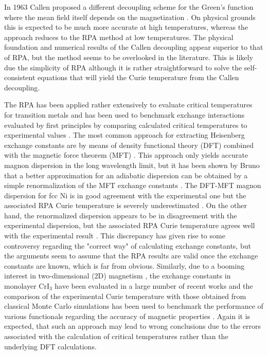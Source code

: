\documentclass[aps,prb,reprint,floatfix,superscriptaddress]{revtex4-2}
\begin{document}
In 1963 Callen proposed a different decoupling scheme for the Green's function where the mean field itself depends on the magnetization \cite{callen1963}. On physical grounds this is expected to be much more accurate at high temperatures, whereas the approach reduces to the RPA method at low temperatures. The physical foundation and numerical results of the Callen decoupling appear superior to that of RPA, but the method seems to be overlooked in the literature. This is likely due the simplicity of RPA although it is rather straightforward to solve the self-consistent equations that will yield the Curie temperature from the Callen decoupling.

The RPA has been applied rather extensively to evaluate critical temperatures for transition metals \cite{Kudrnovsky2001} and has been used to benchmark exchange interactions evaluated by first principles by comparing calculated critical temperatures to experimental values \cite{Bruno2003, Katsnelson2004}. The most common approach for extracting Heisenberg exchange constants are by means of density functional theory (DFT) combined with the magnetic force theorem (MFT) \cite{LIECHTENSTEIN198765}. This approach only yields accurate magnon dispersion in the long wavelength limit, but it has been shown by Bruno that a better approximation for an adiabatic dispersion can be obtained by a simple renormalization of the MFT exchange constants \cite{Bruno2003}. The DFT-MFT magnon dispersion for fcc Ni is in good agreement with the experimental one but the associated RPA Curie temperature is severely underestimated \cite{Katsnelson2004}. On the other hand, the renormalized dispersion appears to be in disagreement with the experimental dispersion, but the associated RPA Curie temperature agrees well with the experimental result \cite{Bruno2003}. This discrepancy has given rise to some controversy regarding the "correct way" of calculating exchange constants, but the arguments seem to assume that the RPA results are valid once the exchange constants are known, which is far from obvious. Similarly, due to a booming interest in two-dimensional (2D) magnetism \cite{Huang2017, Gibertini2019}, the exchange constants in monolayer CrI$_3$ have been evaluated in a large number of recent works \cite{Olsen2017,Lado2017,Xu2018a,Torelli_2019,Olsen2019,Lu2019,Pizzochero2020,Shen2022} and the comparison of the experimental Curie temperature with those obtained from classical Monte Carlo simulations has been used to benchmark the performance of various functionals regarding the accuracy of magnetic properties \cite{Torelli_2019,Lu2019}. Again it is expected, that such an approach may lead to wrong conclusions due to the errors associated with the calculation of critical temperatures rather than the underlying DFT calculations.
\end{document}
